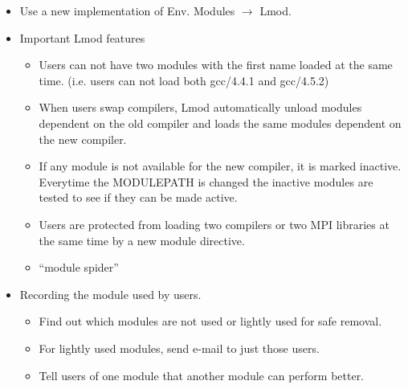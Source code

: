 \documentclass[12pt]{article}
\begin{document}
\begin{itemize}
  \item Use a new implementation of Env. Modules $\rightarrow$ Lmod.

  \item Important Lmod features
    \begin{itemize}
      \item Users can not have two modules with the first name loaded
        at the same time.
        (i.e. users can not load both gcc/4.4.1 and gcc/4.5.2)
      \item When users swap compilers, Lmod automatically unload
        modules dependent on the old compiler and loads the same
        modules dependent on the new compiler.
      \item If any module is not available for the new compiler,
        it is marked inactive.  Everytime the MODULEPATH is changed
        the inactive modules are tested to see if they can be made active.
      \item Users are protected from loading two compilers or two MPI
        libraries at the same time by a new module directive.
      \item ``module spider''
    \end{itemize}


  \item Recording the module used by users.
    \begin{itemize}
      \item Find out which modules are not used or lightly used for
        safe removal.
      \item For lightly used modules, send e-mail to just those users.
      \item Tell users of one module that another module can perform
        better. 
    \end{itemize}

\end{itemize}
\end{document}
